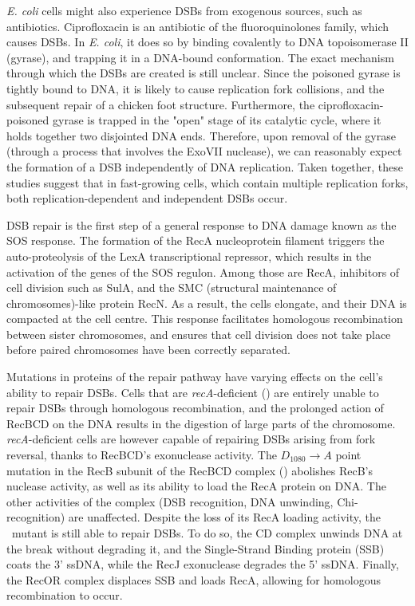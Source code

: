 \emph{E. coli} cells might also experience DSBs from exo\-genous sources, such as anti\-biotics. Ciprofloxacin is an antibiotic of the fluoro\-quinolones family, which causes DSBs. In \emph{E. coli}, it does so by binding covalently to DNA topoisomerase II (gyrase), and trapping it in a DNA-bound conformation\cite{Kohanski2010}. The exact mechanism through which the DSBs are created is still unclear. Since the poisoned gyrase is tightly bound to DNA, it is likely to cause replication fork collisions\cite{Wentzell2000, Drlica2008}, and the subsequent repair of a chicken foot structure. Furthermore, the ciprofloxacin-poisoned gyrase is trapped in the "open" stage of its catalytic cycle, where it holds together two disjointed DNA ends. Therefore, upon removal of the gyrase (through a process that involves the ExoVII nuclease\cite{Huang2021}), we can reasonably expect the formation of a DSB independently of DNA replication\cite{Zhao2006}. Taken together, these studies suggest that in fast-growing cells, which contain multiple replication forks, both replication-dependent and independent DSBs occur.

DSB repair is the first step of a general response to DNA damage known as the SOS response\cite{Baharoglu2014}. The formation of the RecA nucleoprotein filament triggers the auto-proteolysis of the LexA transcriptional repressor, which results in the activation of the genes of the SOS regulon. Among those are RecA, inhibitors of cell division such as SulA, and the SMC (structural maintenance of chromosomes)-like protein RecN. As a result, the cells elongate\cite{Bos2015}, and their DNA is compacted at the cell centre\cite{Odsbu2014}. This response facilitates homologous recombination between sister chromosomes, and ensures that cell division does not take place before paired chromosomes have been correctly separated.

Mutations in proteins of the repair pathway have varying effects on the cell's ability to repair DSBs. Cells that are \emph{recA}-deficient (\dreca) are entirely unable to repair DSBs through homologous recombination, and the prolonged action of RecBCD on the DNA results in the digestion of large parts of the chromosome\cite{Horii1968, Chow2007}. \emph{recA}-deficient cells are however capable of repairing DSBs arising from fork reversal, thanks to RecBCD's exonuclease activity\cite{Seigneur1998, Michel2001}. The $D_{1080} \rightarrow A$ point mutation in the RecB subunit of the RecBCD complex (\teneighty) abolishes RecB's nuclease activity, as well as its ability to load the RecA protein on DNA\cite{Yu1998, Wang2000}. The other activities of the complex (DSB recognition, DNA unwinding, Chi-recognition) are unaffected\cite{Anderson1999}. Despite the loss of its RecA loading activity, the \teneighty\ mutant is still able to repair DSBs. To do so, the \teneighty CD complex unwinds DNA at the break without degrading it, and the Single-Strand Binding protein (SSB) coats the 3' ssDNA, while the RecJ exonuclease degrades the 5' ssDNA. Finally, the RecOR complex displaces SSB and loads RecA, allowing for homologous recombination to occur\cite{Ivancic-Bace_2003}.

